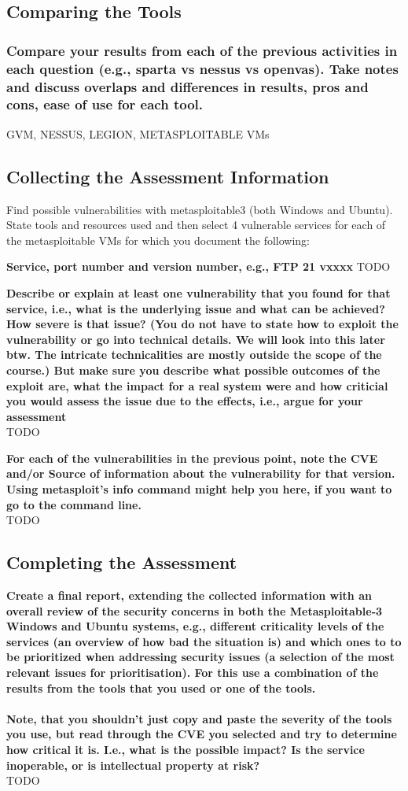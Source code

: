 \subsection*{Comparing the Tools}
\subsubsection*{Compare your results from each of the previous activities in each question (e.g., sparta vs nessus vs openvas). Take notes and discuss overlaps and differences in results, pros and cons, ease of use for each tool.}

GVM, NESSUS, LEGION, METASPLOITABLE VMs

\subsection*{Collecting the Assessment Information}
Find possible vulnerabilities with metasploitable3 (both Windows and Ubuntu).
State tools and resources used and then select 4 vulnerable services for each of the metasploitable VMs for which you document the following:

\textbf{\dag Service, port number and version number, e.g., FTP 21 vxxxx}
TODO

\textbf{\dag Describe or explain at least one vulnerability that you found for that service, i.e., what is the underlying issue and what can be achieved? How severe is that issue? (You do not have to state how to exploit the vulnerability or go into technical details. We will look into this later btw. The intricate technicalities are mostly outside the scope of the course.) But make sure you describe what possible outcomes of the exploit are, what the impact for a real system were and how criticial you would assess the issue due to the effects, i.e., argue for your assessment}\\
TODO

\textbf{\dag For each of the vulnerabilities in the previous point, note the CVE and/or Source of information about the vulnerability for that version. Using metasploit’s info command might help you here, if you want to go to the command line.}\\
TODO

\subsection*{Completing the Assessment}
\textbf{\dag
    Create a final report, extending the collected information with an overall review of the security concerns in both the Metasploitable-3 Windows and Ubuntu systems, e.g., different criticality levels of the services (an overview of how bad the situation is) and which ones to to be prioritized when addressing security issues (a selection of the most relevant issues for prioritisation). For this use a combination of the results from the tools that you used or one of the tools.\\\\
    Note, that you shouldn’t just copy and paste the severity of the tools you use, but read through the CVE you selected and try to determine how critical it is. I.e., what is the possible impact? Is the service inoperable, or is intellectual property at risk?}\\
TODO